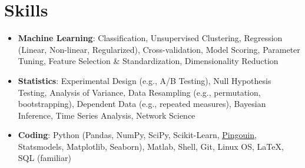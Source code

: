 \documentclass[letterpaper,10pt]{article}
\newcommand{\resumeSubHeadingListStart}{\begin{itemize}[leftmargin=*]}
\newcommand{\resumeSubHeadingListEnd}{\end{itemize}}
\begin{document}
\section{Skills}
 \resumeSubHeadingListStart
   \item{
    \textbf{Machine Learning}{: Classification, Unsupervised Clustering, Regression (Linear, Non-linear, Regularized), Cross-validation, Model Scoring, Parameter Tuning, Feature Selection \& Standardization, Dimensionality Reduction}
    }
   \item{
    \textbf{Statistics}{: Experimental Design (e.g., A/B Testing), Null Hypothesis Testing, Analysis of Variance, Data Resampling (e.g., permutation, bootstrapping), Dependent Data (e.g., repeated measures), Bayesian Inference, Time Series Analysis, Network Science}
    }
   \item{
    \textbf{Coding}{: Python (Pandas, NumPy, SciPy, Scikit-Learn, \href{https://pingouin-stats.org/}{\underline{Pingouin}}, Statsmodels, Matplotlib, Seaborn), Matlab, Shell, Git, Linux OS, LaTeX, SQL (familiar)}
    }
 \resumeSubHeadingListEnd


\end{document}
